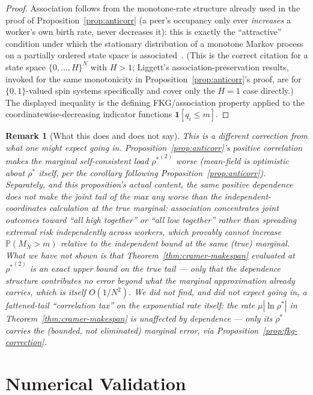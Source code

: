 \documentclass[11pt,a4paper]{report}
\newtheorem{remark}{Remark}[section]
\newcommand{\abs}[1]{\left\lvert #1 \right\rvert}
\newcommand{\rhostar}{\rho^{*}}
\begin{document}
\begin{proof}
Association follows from the monotone-rate structure already used in
the proof of Proposition~\ref{prop:anticorr} (a peer's occupancy only
ever \emph{increases} a worker's own birth rate, never decreases it):
this is exactly the ``attractive'' condition under which the
stationary distribution of a monotone Markov process on a partially
ordered state space is associated~\cite{harris1977}. (This is the
correct citation for a state space $\{0,\ldots,H\}^N$ with $H>1$;
Liggett's association-preservation results, invoked for the same
monotonicity in Proposition~\ref{prop:anticorr}'s proof, are for
$\{0,1\}$-valued spin systems specifically and cover only the $H=1$
case directly.) The displayed inequality is the defining
FKG/association property applied to the coordinatewise-decreasing
indicator functions $\mathbf{1}[q_i \leq m]$.
\end{proof}

\begin{remark}[What this does and does not say]
This is a different correction from what one might expect going in.
Proposition~\ref{prop:anticorr}'s positive correlation makes the
\emph{marginal} self-consistent load ${\rhostar}^{(2)}$ worse (mean-field
is optimistic about $\rhostar$ itself, per the corollary following
Proposition~\ref{prop:anticorr}). Separately, and this proposition's
actual content, the \emph{same} positive dependence does not make the
joint tail of the max any worse than the independent-coordinates
calculation at the \emph{true} marginal: association concentrates
joint outcomes toward ``all high together'' or ``all low together''
rather than spreading extremal risk independently across workers,
which provably cannot increase $\mathbb{P}(M_N > m)$ relative to the
independent bound at the same (true) marginal. What we have \emph{not}
shown is that Theorem~\ref{thm:cramer-makespan} evaluated at
${\rhostar}^{(2)}$ is an exact upper bound on the true tail --- only
that the dependence structure contributes no error beyond what the
marginal approximation already carries, which is itself $O(1/N^2)$.
We did not find, and did not expect going in, a fattened-tail
``correlation tax'' on the exponential rate itself; the rate
$\mu\abs{\ln\rhostar}$ in Theorem~\ref{thm:cramer-makespan} is
unaffected by dependence --- only its $\rhostar$ carries the (bounded,
not eliminated) marginal error, via Proposition~\ref{prop:fkg-correction}.
\end{remark}

\section{Numerical Validation}
\label{sec:numerical}
\end{document}
